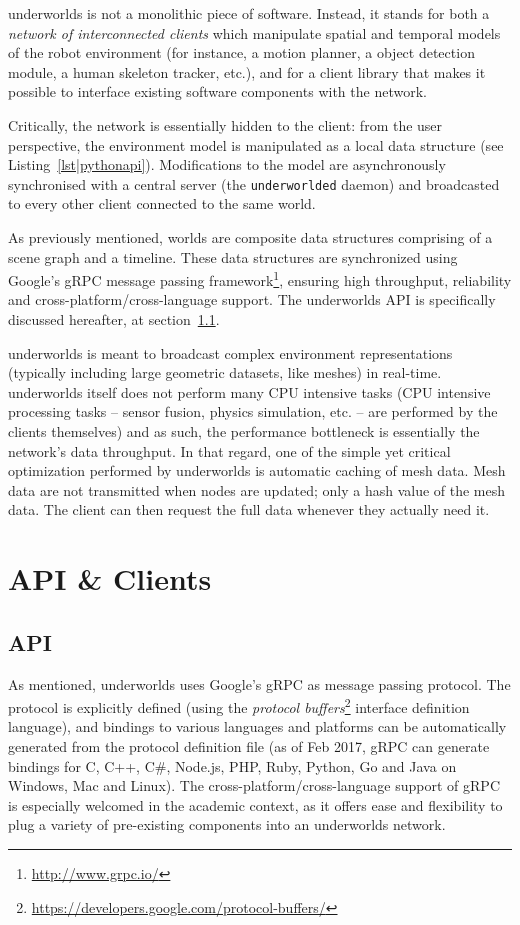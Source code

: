 \documentclass[letterpaper, 10 pt, conference]{ieeeconf}  %
\newcommand{\uwds}{{\sc underworlds}\xspace}
\begin{document}
\uwds is not a monolithic piece of software. Instead, it stands for both a
\emph{network of interconnected clients} which manipulate spatial and temporal
models of the robot environment (for instance, a motion planner, a object
detection module, a human skeleton tracker, etc.), and for a {client library}
that makes it possible to interface existing software components with the network.

Critically, the network is essentially hidden to the client: from the user
perspective, the environment model is manipulated as a local data structure (see
Listing~\ref{lst|pythonapi}). Modifications to the model are asynchronously synchronised with
a central server (the {\tt underworlded} daemon) and broadcasted to every other
client connected to the same world.

As previously mentioned, worlds are composite data structures comprising of a
scene graph and a timeline. These data structures are synchronized using
Google's gRPC message passing framework\footnote{\url{http://www.grpc.io/}}, ensuring
high throughput, reliability and cross-platform/cross-language support. The \uwds
API is specifically discussed hereafter, at section~\ref{api}.


\uwds is meant to broadcast complex environment representations (typically
including large geometric datasets, like meshes) in real-time. \uwds itself does
not perform many CPU intensive tasks (CPU intensive processing tasks -- sensor
fusion, physics simulation, etc. -- are performed by the clients themselves) and
as such, the performance bottleneck is essentially the network's data
throughput.  In that regard, one of the simple yet critical optimization
performed by \uwds is automatic caching of mesh data. Mesh data are not
transmitted when nodes are updated; only a hash value of the mesh data. The
client can then request the full data whenever they actually need it.



\section{API \& Clients}

\subsection{API}
\label{api}

As mentioned, \uwds uses Google's gRPC as message passing protocol. The protocol
is explicitly defined (using the \emph{protocol
buffers}\footnote{\url{https://developers.google.com/protocol-buffers/}}
interface definition language), and bindings to various languages and platforms
can be automatically generated from the protocol definition file (as of Feb
2017, gRPC can generate bindings for C, C++, C\#, Node.js, PHP, Ruby, Python, Go
and Java on Windows, Mac and Linux).  The cross-platform/cross-language support
of gRPC is especially welcomed in the academic context, as it offers ease and
flexibility to plug a variety of pre-existing components into an \uwds network.
\end{document}
